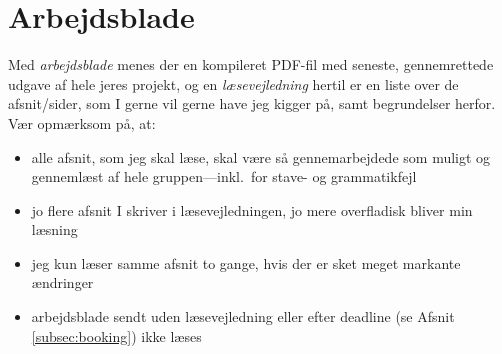 \section{Arbejdsblade}
\label{sec:workingpapers}
Med \emph{arbejdsblade} menes der en kompileret PDF-fil med seneste, gennemrettede udgave af hele jeres projekt, og en \emph{læsevejledning} hertil er en liste over de afsnit/sider, som I gerne vil gerne have jeg kigger på, samt begrundelser herfor.
Vær opmærksom på, at:
\begin{itemize}
\item alle afsnit, som jeg skal læse, skal være så gennemarbejdede som muligt og gennemlæst af hele gruppen---inkl.\ for stave- og grammatikfejl
\item jo flere afsnit I skriver i læsevejledningen, jo mere overfladisk bliver min læsning
\item jeg kun læser samme afsnit to gange, hvis der er sket meget markante ændringer
\item arbejdsblade sendt uden læsevejledning eller efter deadline (se Afsnit \ref{subsec:booking}) ikke læses
\end{itemize}
